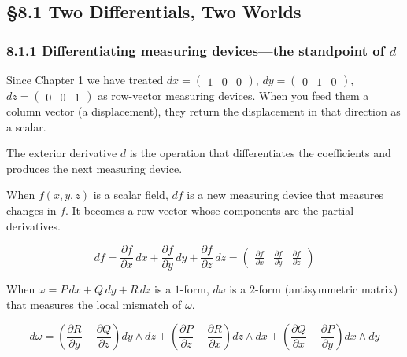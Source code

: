 \documentclass[a4paper,12pt,openany]{book}
\begin{document}
\hypertarget{two-differentials-two-worlds}{%
\subsection{§8.1 Two Differentials, Two
Worlds}\label{two-differentials-two-worlds}}

\hypertarget{differentiating-measuring-devicesthe-standpoint-of-d}{%
\subsubsection{\texorpdfstring{8.1.1 Differentiating measuring
devices—the standpoint of
\(d\)}{8.1.1 Differentiating measuring devices—the standpoint of d}}\label{differentiating-measuring-devicesthe-standpoint-of-d}}

Since Chapter 1 we have treated
\(dx = \begin{pmatrix}1&0&0\end{pmatrix}\),
\(dy = \begin{pmatrix}0&1&0\end{pmatrix}\),
\(dz = \begin{pmatrix}0&0&1\end{pmatrix}\) as row-vector measuring
devices. When you feed them a column vector (a displacement), they
return the displacement in that direction as a scalar.

The exterior derivative \(d\) is the operation that differentiates the
coefficients and produces the next measuring device.

When \(f(x,y,z)\) is a scalar field, \(df\) is a new measuring device
that measures changes in \(f\). It becomes a row vector whose components
are the partial derivatives.

\[df = \frac{\partial f}{\partial x}\,dx + \frac{\partial f}{\partial y}\,dy + \frac{\partial f}{\partial z}\,dz = \begin{pmatrix} \frac{\partial f}{\partial x} & \frac{\partial f}{\partial y} & \frac{\partial f}{\partial z} \end{pmatrix}\]

When \(\omega = P\,dx + Q\,dy + R\,dz\) is a \(1\)-form, \(d\omega\) is
a \(2\)-form (antisymmetric matrix) that measures the local mismatch of
\(\omega\).

\[d\omega = \left(\frac{\partial R}{\partial y}-\frac{\partial Q}{\partial z}\right)dy\wedge dz + \left(\frac{\partial P}{\partial z}-\frac{\partial R}{\partial x}\right)dz\wedge dx + \left(\frac{\partial Q}{\partial x}-\frac{\partial P}{\partial y}\right)dx\wedge dy\]
\end{document}
